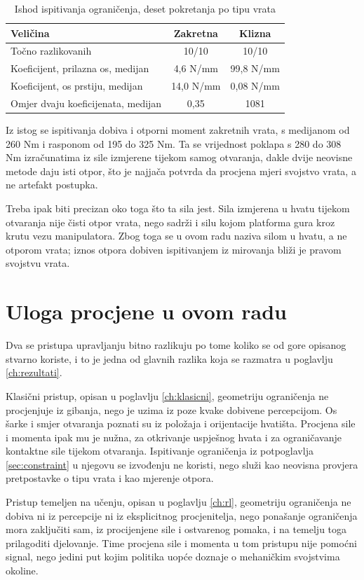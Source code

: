 \begin{table}[H]
    \centering
    \caption{Ishod ispitivanja ograničenja, deset pokretanja po tipu vrata}
    \label{tab:provjera-probe}
    \begin{tabular}{@{}lcc@{}}
        \toprule
        Veličina                           & Zakretna  & Klizna    \\
        \midrule
        Točno razlikovanih                 & 10/10     & 10/10     \\
        Koeficijent, prilazna os, medijan  & 4,6 N/mm  & 99,8 N/mm \\
        Koeficijent, os prstiju, medijan   & 14,0 N/mm & 0,08 N/mm \\
        Omjer dvaju koeficijenata, medijan & 0,35      & 1081      \\
        \bottomrule
    \end{tabular}
\end{table}

Iz istog se ispitivanja dobiva i otporni moment zakretnih vrata, s medijanom od 260 Nm i rasponom
od 195 do 325 Nm. Ta se vrijednost poklapa s 280 do 308 Nm izračunatima iz sile izmjerene tijekom
samog otvaranja, dakle dvije neovisne metode daju isti otpor, što je najjača potvrda da
procjena mjeri svojstvo vrata, a ne artefakt postupka.

Treba ipak biti precizan oko toga što ta sila jest. Sila izmjerena u hvatu tijekom otvaranja nije
čisti otpor vrata, nego sadrži i silu kojom platforma gura kroz krutu vezu manipulatora. Zbog toga
se u ovom radu naziva silom u hvatu, a ne otporom vrata; iznos otpora dobiven ispitivanjem iz
mirovanja bliži je pravom svojstvu vrata.

\section{Uloga procjene u ovom radu}
\label{sec:procjena-uloga}

Dva se pristupa upravljanju bitno razlikuju po tome koliko se od gore opisanog stvarno koriste, i
to je jedna od glavnih razlika koja se razmatra u poglavlju \ref{ch:rezultati}.

Klasični pristup, opisan u poglavlju \ref{ch:klasicni}, geometriju ograničenja ne procjenjuje iz
gibanja, nego je uzima iz poze kvake dobivene percepcijom. Os šarke i smjer otvaranja poznati su
iz položaja i orijentacije hvatišta. Procjena sile i momenta ipak mu je nužna, za otkrivanje
uspješnog hvata i za ograničavanje kontaktne sile tijekom otvaranja. Ispitivanje ograničenja iz
potpoglavlja \ref{sec:constraint} u njegovu se izvođenju ne koristi, nego služi kao neovisna
provjera pretpostavke o tipu vrata i kao mjerenje otpora.

Pristup temeljen na učenju, opisan u poglavlju \ref{ch:rl}, geometriju ograničenja ne dobiva ni iz
percepcije ni iz eksplicitnog procjenitelja, nego ponašanje ograničenja mora zaključiti sam, iz
procijenjene sile i ostvarenog pomaka, i na temelju toga prilagoditi djelovanje. Time procjena sile
i momenta u tom pristupu nije pomoćni signal, nego jedini put kojim politika uopće doznaje o
mehaničkim svojstvima okoline.